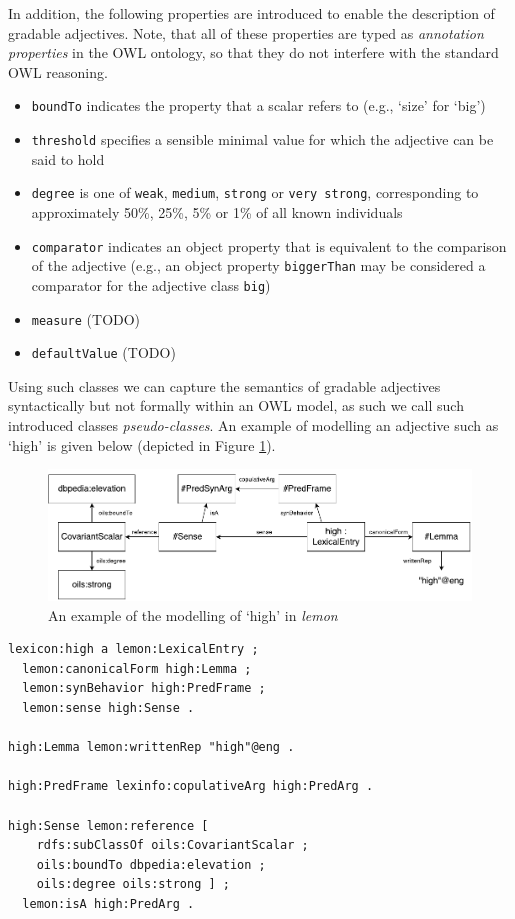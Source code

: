 \documentclass[11pt]{article}
\begin{document}
In addition, the following properties are introduced to enable the description 
of gradable adjectives. Note, that all of these properties are typed as 
\emph{annotation properties} in the OWL ontology, so that they do not interfere 
with the standard OWL reasoning.

\begin{itemize}
	\item {\tt boundTo} indicates the property that a scalar refers to (e.g., `size' for `big')
	\item {\tt threshold} specifies a sensible minimal value for which the adjective can be said to hold
	\item {\tt degree} is one of {\tt weak}, {\tt medium}, {\tt strong} or {\tt very strong}, corresponding to approximately 50\%, 25\%, 5\% or 1\% of all known individuals
	\item {\tt comparator} indicates an object property that is equivalent to the comparison of the adjective (e.g., an object property {\tt biggerThan} may be considered a comparator for the adjective class {\tt big})
	\item {\tt measure} (TODO)
	\item {\tt defaultValue} (TODO)
\end{itemize}

Using such classes we can capture the semantics of gradable adjectives 
syntactically but not formally within an OWL model, as such we call such 
introduced classes \emph{pseudo-classes}. An example of modelling an adjective 
such as `high' is given below (depicted in Figure \ref{high-example}).

\begin{figure}
\includegraphics[width=\textwidth]{high-example}
\caption{An example of the modelling of `high' in \emph{lemon}\label{high-example}}
\end{figure}

\begin{verbatim}
lexicon:high a lemon:LexicalEntry ;
  lemon:canonicalForm high:Lemma ;
  lemon:synBehavior high:PredFrame ;
  lemon:sense high:Sense .

high:Lemma lemon:writtenRep "high"@eng .

high:PredFrame lexinfo:copulativeArg high:PredArg .

high:Sense lemon:reference [
    rdfs:subClassOf oils:CovariantScalar ;
    oils:boundTo dbpedia:elevation ;
    oils:degree oils:strong ] ;
  lemon:isA high:PredArg .
\end{verbatim}
\end{document}
